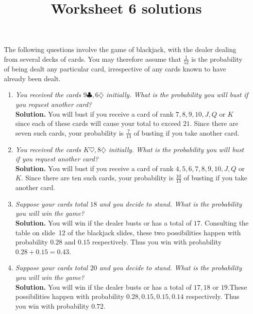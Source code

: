 \documentclass[12pt]{article}
\author{}\date{}
\title{Worksheet 6 solutions}\author{}
\begin{document}
\maketitle
\pagestyle{empty}
The following questions involve the game of blackjack,
with the dealer dealing from several decks of cards.
You may therefore assume that $\frac{1}{52}$ is the probability
of being dealt any particular card, irrespective of any cards
known to have already been dealt. 
\begin{enumerate}

\item{\em You received the cards $9\clubsuit,6\diamondsuit$
initially. What is the probability you will bust if
you request another card?}\\
{\bf Solution.} You will bust if you receive a card of rank
$7,8,9,10,J,Q$ or $K$ since each of these cards will
cause your total to exceed $21$. Since there are seven such cards,
your probability is $\frac{7}{13}$ of busting if you take another card.

\item{\em You received the cards $K\heartsuit,8\diamondsuit$
initially. What is the probability you will bust if
you request another card?}\\
{\bf Solution.} You will bust if you receive a card of rank
 $4,5,6,7,8,9,10,J,Q$ or $K$. Since there are ten such cards,
your probability is $\frac{10}{13}$ of busting if you take another card.

\item{\em Suppose your cards total $18$ and you decide to stand.
What is the probability you will win the game?}\\
{\bf Solution.} You will win if the dealer busts or has a total of $17$.
Consulting the table on slide~12 of the blackjack slides, these
two possibilities happen with probability $0.28$ and $0.15$ respectively.
Thus you win with probability $0.28+0.15=0.43$.

\item{\em Suppose your cards total $20$ and you decide to stand.
What is the probability you will win the game?}\\
{\bf Solution.} You will win if the dealer busts or has a total of $17,18$
or $19$.These
possibilities happen with probability $0.28,0.15,0.15,0.14$ respectively.
Thus you win with probability $0.72$.


\end{enumerate}
\end{document}
